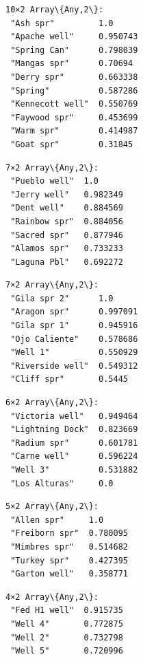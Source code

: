 \documentclass[11pt]{article}
\begin{document}
    
    \begin{Verbatim}[commandchars=\\\{\}]
10×2 Array\{Any,2\}:
 "Ash spr"         1.0
 "Apache well"     0.950743
 "Spring Can"      0.798039
 "Mangas spr"      0.70694
 "Derry spr"       0.663338
 "Spring"          0.587286
 "Kennecott well"  0.550769
 "Faywood spr"     0.453699
 "Warm spr"        0.414987
 "Goat spr"        0.31845
    \end{Verbatim}

    
    
    \begin{Verbatim}[commandchars=\\\{\}]
7×2 Array\{Any,2\}:
 "Pueblo well"  1.0
 "Jerry well"   0.982349
 "Dent well"    0.884569
 "Rainbow spr"  0.884056
 "Sacred spr"   0.877946
 "Alamos spr"   0.733233
 "Laguna Pbl"   0.692272
    \end{Verbatim}

    
    
    \begin{Verbatim}[commandchars=\\\{\}]
7×2 Array\{Any,2\}:
 "Gila spr 2"      1.0
 "Aragon spr"      0.997091
 "Gila spr 1"      0.945916
 "Ojo Caliente"    0.578686
 "Well 1"          0.550929
 "Riverside well"  0.549312
 "Cliff spr"       0.5445
    \end{Verbatim}

    
    
    \begin{Verbatim}[commandchars=\\\{\}]
6×2 Array\{Any,2\}:
 "Victoria well"   0.949464
 "Lightning Dock"  0.823669
 "Radium spr"      0.601781
 "Carne well"      0.596224
 "Well 3"          0.531882
 "Los Alturas"     0.0
    \end{Verbatim}

    
    
    \begin{Verbatim}[commandchars=\\\{\}]
5×2 Array\{Any,2\}:
 "Allen spr"     1.0
 "Freiborn spr"  0.780095
 "Mimbres spr"   0.514682
 "Turkey spr"    0.427395
 "Garton well"   0.358771
    \end{Verbatim}

    
    
    \begin{Verbatim}[commandchars=\\\{\}]
4×2 Array\{Any,2\}:
 "Fed H1 well"  0.915735
 "Well 4"       0.772875
 "Well 2"       0.732798
 "Well 5"       0.720996
    \end{Verbatim}
\end{document}
